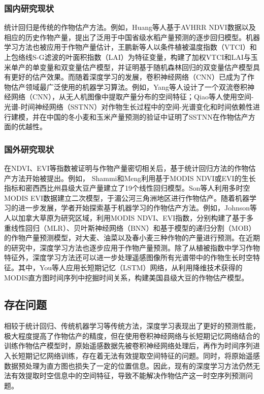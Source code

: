 \subsubsection {国内研究现状}

\par 统计回归是传统的作物估产方法。例如，Huang等人\cite{huang2013remotely}基于AVHRR NDVI数据以及相应的历史作物产量，提出了泛用于中国省级水稻产量预测的逐步回归模型。机器学习方法也被应用于作物产量估计，王鹏新等人\cite{NYJX201907026}以条件植被温度指数（VTCI）和上包络线S-G滤波的叶面积指数（LAI）为特征变量，构建了加权VTCI和LAI与玉米单产的单变量和双变量估产模型，并证明基于随机森林回归的双变量估产模型具有更好的估产效果。而随着深度学习的发展，卷积神经网络（CNN）已成为了作物估产领域最广泛使用的机器学习算法\cite{van2020crop}。例如，Yang等人设计了一个双流卷积神经网络（CNN），从无人机图像中提取产量分布的空间特征\cite{yang2019deep}；Qiao等人使用空间-光谱-时间神经网络（SSTNN）对作物生长过程中的空间-光谱变化和时间依赖性进行建模\cite{qiao2021crop}，并在中国的冬小麦和玉米产量预测的验证中证明了SSTNN在作物估产方面的优越性。

\subsubsection {国外研究现状}

\par 在NDVI、EVI等指数被证明与作物产量密切相关后，基于统计回归方法的作物估产方法开始被提出。例如， Shammi和Meng\cite{shammi2021use}利用基于MODIS NDVI或EVI的生长指标和密西西比州县级大豆产量建立了19个线性回归模型。Son等人\cite{son2014comparative}利用多时空MODIS EVI数据建立二次模型，于湄公河三角洲地区进行作物估产。随着机器学习的进一步发展，学者开始探索基于机器学习的作物估产方法。例如，Johnson等人\cite{johnson2016crop}以加拿大草原为研究区域，利用MODIS NDVI、EVI指数，分别构建了基于多重线性回归（MLR）、贝叶斯神经网络（BNN）和基于模型的递归分割（MOB）的作物产量预测模型，对大麦、油菜以及春小麦三种作物的产量进行预测。在近期的研究中，深度学习方法也逐步应用于作物产量预测。除了从植被指数中学习作物特征外，深度学习方法还可以进一步处理遥感图像所有光谱带中的作物生长时空特征。其中，You等人应用长短期记忆（LSTM）网络，从利用降维技术获得的MODIS直方图时间序列中挖掘时间关系，构建美国县级大豆的作物估产模型\cite{you2017deep}。

\subsection{存在问题}

\par 相较于统计回归、传统机器学习等传统方法，深度学习表现出了更好的预测性能，极大程度提高了作物估产的精度，但在使用卷积神经网络与长短期记忆网络结合的训练作物估产模型时，原始遥感数据先被卷积神经网络处理后，再作为时间序列进入长短期记忆网络训练，存在着无法有效提取空间特征的问题。同时，将原始遥感数据预处理为直方图也损失了一定的位置信息。因此，现有的深度学习方法仍然无法有效提取时空信息中的空间特征，导致不能解决作物估产这一时空序列预测问题。

